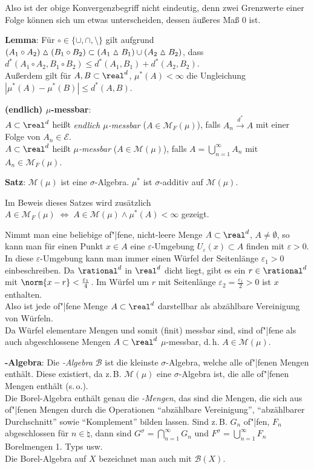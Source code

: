 Also ist der obige Konvergenzbegriff nicht eindeutig, denn zwei Grenzwerte
einer Folge können sich um etwas unterscheiden, dessen äußeres Maß $0$ ist.

\linie

\textbf{Lemma}:
Für $\circ \in \{\cup, \cap, \setminus\}$ gilt aufgrund
$(A_1 \circ A_2) \vartriangle (B_1 \circ B_2) \subset
(A_1 \vartriangle B_1) \cup (A_2 \vartriangle B_2)$, dass
$d^\ast(A_1 \circ A_2, B_1 \circ B_2) \le
d^\ast(A_1, B_1) + d^\ast(A_2, B_2)$. \\
Außerdem gilt für $A, B \subset \real^d$, $\mu^\ast(A) < \infty$
die Ungleichung $|\mu^\ast(A) - \mu^\ast(B)| \le d^\ast(A, B)$.

\textbf{(endlich) $\mu$-messbar}:\\
$A \subset \real^d$ heißt \emph{endlich $\mu$-messbar}
($A \in \mathcal{M}_F(\mu)$), falls $A_n \xrightarrow{d^\ast} A$ mit einer Folge von
$A_n \in \mathcal{E}$. \\
$A \subset \real^d$ heißt \emph{$\mu$-messbar}
($A \in \mathcal{M}(\mu)$), falls $A = \bigcup_{n=1}^\infty A_n$ mit
$A_n \in \mathcal{M}_F(\mu)$.

\textbf{Satz}:
$\mathcal{M}(\mu)$ ist eine $\sigma$-Algebra.
$\mu^\ast$ ist $\sigma$-additiv auf $\mathcal{M}(\mu)$.

Im Beweis dieses Satzes wird zusätzlich
$A \in \mathcal{M}_F(\mu) \;\Leftrightarrow\;
A \in \mathcal{M}(\mu) \land \mu^\ast(A) < \infty$
gezeigt.

\linie

Nimmt man eine beliebige of"|fene, nicht-leere Menge $A \subset \real^d$,
$A \not= \emptyset$, so kann man für einen Punkt $x \in A$ eine
$\varepsilon$-Umgebung $U_\varepsilon(x) \subset A$ finden mit
$\varepsilon > 0$.
In diese $\varepsilon$-Umgebung kann man immer einen Würfel der Seitenlänge
$\varepsilon_1 > 0$ einbeschreiben.
Da $\rational^d$ in $\real^d$ dicht liegt, gibt es ein $r \in \rational^d$
mit $\norm{x - r} < \frac{\varepsilon_1}{4}$.
Im Würfel um $r$ mit Seitenlänge $\varepsilon_2 = \frac{\varepsilon_1}{2} > 0$
ist $x$ enthalten. \\
Also ist jede of"|fene Menge $A \subset \real^d$ darstellbar als
abzählbare Vereinigung von Würfeln. \\
Da Würfel elementare Mengen und somit (finit) messbar sind, sind
of"|fene als auch abgeschlossene Mengen $A \subset \real^d$ $\mu$-messbar,
d.\,h. $A \in \mathcal{M}(\mu)$.

\textbf{-Algebra}:
Die \emph{-Algebra} $\mathcal{B}$
ist die kleinste $\sigma$-Algebra, welche alle of"|fenen Mengen enthält.
Diese existiert, da z.\,B. $\mathcal{M}(\mu)$ eine $\sigma$-Algebra ist,
die alle of"|fenen Mengen enthält (s.\,o.). \\
Die Borel-Algebra enthält genau die \emph{-Mengen}, das sind
die Mengen, die sich aus of"|fenen Mengen durch die Operationen
"`abzählbare Vereinigung"', "`abzählbarer Durchschnitt"' sowie "`Komplement"'
bilden lassen.
Sind z.\,B. $G_n$ of"|fen, $F_n$ abgeschlossen für $n \in \natural$, dann sind
$G^\sigma = \bigcap_{n=1}^\infty G_n$ und $F^\sigma = \bigcup_{n=1}^\infty F_n$
Borelmengen 1. Typs usw. \\
Die Borel-Algebra auf $X$ bezeichnet man auch mit $\mathcal{B}(X)$.

